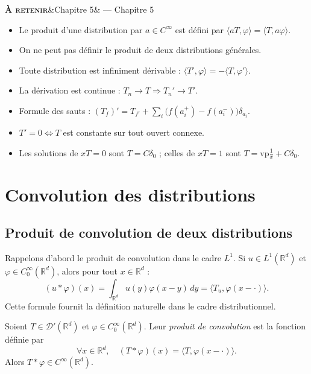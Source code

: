 \documentclass[12pt,a4paper,openany]{book}
\theoremstyle{definition}
\theoremstyle{plain}
\theoremstyle{remark}
\newenvironment{retenir}[1]{%
	\begin{mdframed}[linewidth=3pt, linecolor=black!70,
		topline=false, rightline=false, bottomline=false,
		backgroundcolor=shaderet,
		skipabove=14pt, skipbelow=14pt,
		innerleftmargin=14pt, innerrightmargin=8pt,
		innertopmargin=8pt, innerbottommargin=8pt]%
		\noindent\textbf{\scshape À retenir}\ifx&#1&\else{} — #1\fi\par\smallskip%
	}{%
	\end{mdframed}%
}
\begin{document}
	\begin{retenir}{Chapitre 5}
		\begin{itemize}
			\item Le produit d'une distribution par $a \in C^\infty$ est défini par $\langle aT, \varphi \rangle = \langle T, a\varphi \rangle$.
			\item On ne peut pas définir le produit de deux distributions générales.
			\item Toute distribution est infiniment dérivable : $\langle T', \varphi \rangle = -\langle T, \varphi' \rangle$.
			\item La dérivation est continue : $T_n \to T \Rightarrow T_n' \to T'$.
			\item Formule des sauts : $(T_f)' = T_{f'} + \sum_i \bigl(f(a_i^+) - f(a_i^-)\bigr)\delta_{a_i}$.
			\item $T' = 0 \Leftrightarrow T$ est constante sur tout ouvert connexe.
			\item Les solutions de $xT = 0$ sont $T = C\delta_0$ ; celles de $xT = 1$ sont $T = \mathrm{vp}\frac{1}{x} + C\delta_0$.
		\end{itemize}
	\end{retenir}
	
	\chapter{Convolution des distributions}
	
	\section{Produit de convolution de deux distributions}
	
	Rappelons d'abord le produit de convolution dans le cadre $L^1$. Si $u \in L^1(\mathbb{R}^d)$ et $\varphi \in C_0^\infty(\mathbb{R}^d)$, alors pour tout $x \in \mathbb{R}^d$ :
	\[
	(u * \varphi)(x) = \int_{\mathbb{R}^d} u(y)\varphi(x-y)\,dy = \langle T_u, \varphi(x - \cdot) \rangle.
	\]
	Cette formule fournit la définition naturelle dans le cadre distributionnel.
	
	\begin{definition}
		Soient $T \in \mathcal{D}'(\mathbb{R}^d)$ et $\varphi \in C_0^\infty(\mathbb{R}^d)$. Leur \emph{produit de convolution} est la fonction définie par
		\[
		\forall x \in \mathbb{R}^d, \quad (T * \varphi)(x) = \langle T, \varphi(x - \cdot) \rangle.
		\]
		Alors $T * \varphi \in C^\infty(\mathbb{R}^d)$.
	\end{definition}
	
\end{document}
